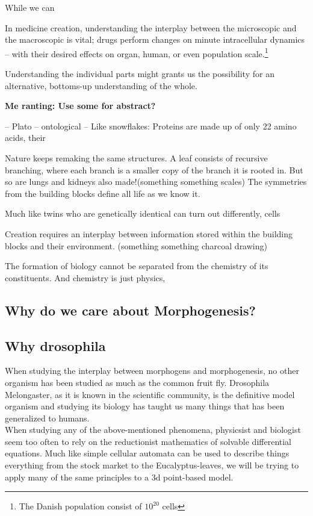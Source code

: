  While we can 




In medicine creation, understanding the interplay between the microscopic and the macroscopic is vital; drugs perform changes on minute intracellular dynamics -- with their desired effects on organ, human, or even population scale.\footnote{The Danish population consist of $10^{20}$ cells}

Understanding the individual parts might grants us the possibility for an alternative, bottoms-up understanding of the whole.


\textbf{Me ranting: Use some for abstract?}

 -- Plato -- ontological --
Like snowflakes:
Proteins are made up of only 22 amino acids, their 

Nature keeps remaking the same structures. A leaf consists of recursive branching, where each branch is a smaller copy of the branch it is rooted in. But so are lungs and kidneys also made!(something something scales)  The symmetries from the building blocks define all life as we know it. 

Much like twins who are genetically identical can turn out differently, cells

Creation requires an interplay between information stored within the building blocks and their environment. (something something charcoal drawing)

The formation of biology cannot be separated from the chemistry of its constituents. And chemistry is just physics, 

\subsection{Why do we care about Morphogenesis?}


\subsection{Why drosophila}
When studying the interplay between morphogens and morphogenesis, no other organism has been studied as much as the common fruit fly. Drosophila Melongaster, as it is known in the scientific community, is the definitive model organism and studying its biology has taught us many things that has been generalized to humans. \\


When studying any of the above-mentioned phenomena, physicsist and biologist seem too often to rely on the reductionist mathematics of solvable differential equations. Much like simple cellular automata can be used to describe things everything from the stock market to the Eucalyptus-leaves, we will be trying to apply many of the same principles to a 3d point-based model.

